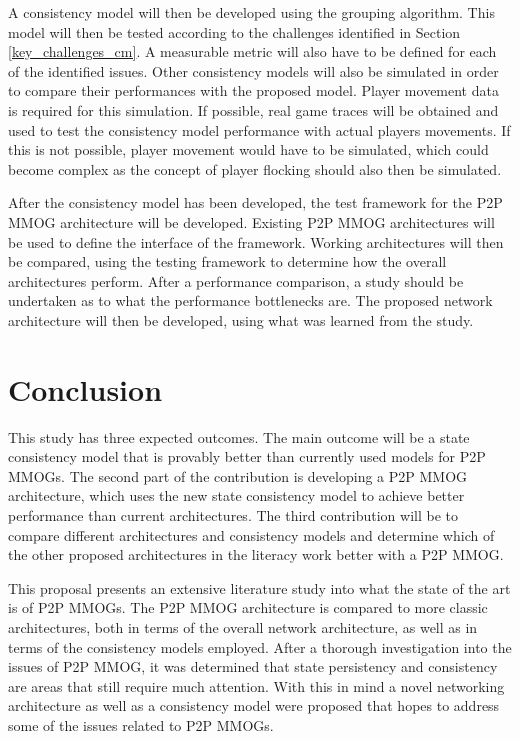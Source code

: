 \documentclass[journal,oneside,a4paper,onecolumn]{IEEEtran}
\begin{document}
A consistency model will then be developed using the grouping algorithm. This model will then be tested according to the challenges identified in Section \ref{key_challenges_cm}. A measurable metric will also have to be defined for each of the identified issues. Other consistency models will also be simulated in order to compare their performances with the proposed model. Player movement data is required for this simulation. If possible, real game traces will be obtained and used to test the consistency model performance with actual players movements. If this is not possible, player movement would have to be simulated, which could become complex as the concept of player flocking should also then be simulated.

After the consistency model has been developed, the test framework for the P2P MMOG architecture will be developed. Existing P2P MMOG architectures will be used to define the interface of the framework. Working architectures will then be compared, using the testing framework to determine how the overall architectures perform. After a performance comparison, a study should be undertaken as to what the performance bottlenecks are. The proposed network architecture will then be developed, using what was learned from the study.


\section{Conclusion}

This study has three expected outcomes. The main outcome will be a state consistency model that is provably better than currently used models for P2P MMOGs. The second part of the contribution is developing a P2P MMOG architecture, which uses the new state consistency model to achieve better performance than current architectures. The third contribution will be to compare different architectures and consistency models and determine which of the other proposed architectures in the literacy work better with a P2P MMOG.

This proposal presents an extensive literature study into what the state of the art is of P2P MMOGs. The P2P MMOG architecture is compared to more classic architectures, both in terms of the overall network architecture, as well as in terms of the consistency models employed. After a thorough investigation into the issues of P2P MMOG, it was determined that state persistency and consistency are areas that still require much attention. With this in mind a novel networking architecture as well as a consistency model were proposed that hopes to address some of the issues related to P2P MMOGs.
\end{document}
